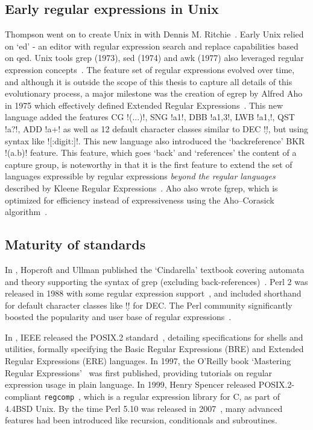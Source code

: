 \subsection{Early regular expressions in Unix}
Thompson went on to create Unix in \citeyear{Ritchie:1974:UTS:361011.361061} with Dennis M. Ritchie~.  Early Unix relied on `ed' - an editor with regular expression search and replace capabilities based on qed.  Unix tools grep (1973), sed (1974) and awk (1977) also leveraged regular expression concepts~.  The feature set of regular expressions evolved over time, and although it is outside the scope of this thesis to capture all details of this evolutionary process, a major milestone was the creation of egrep by Alfred Aho in 1975 which effectively defined Extended Regular Expressions~.  This new language added the features CG \bverb!(...)!, SNG \bverb!a{1}!, DBB \bverb!a{1,3}!, LWB \bverb!a{1,}!, QST \bverb!a?!, ADD \bverb!a+! as well as 12 default character classes similar to DEC \bverb!\d!, but using syntax like \bverb![:digit:]!. This new language also introduced the `backreference' BKR \bverb!(a.b)\1! feature.  This feature, which goes `back' and  `references' the content of a capture group, is noteworthy in that it is the first feature to extend the set of languages expressible by regular expressions \emph{beyond the regular languages} described by Kleene Regular Expressions~. Aho also wrote fgrep, which is optimized for efficiency instead of expressiveness using the Aho–Corasick algorithm~.

\subsection{Maturity of standards}
In \citeyear{HopcroftUllman1979}, Hopcroft and Ullman published the `Cindarella' textbook covering automata and theory supporting the syntax of grep (excluding back-references)~.  Perl 2 was released in 1988 with some regular expression support~, and included shorthand for default character classes like \bverb!\d! for DEC.  The Perl community significantly boosted the popularity and user base of regular expressions~.

In \citeyear{IEEE1994POSIX2}, IEEE released the POSIX.2 standard~, detailing specifications for shells and utilities, formally specifying the Basic Regular Expressions (BRE) and Extended Regular Expressions (ERE) languages.  In 1997, the O'Reilly book `Mastering Regular Expressions'~ was first published, providing tutorials on regular expression usage in plain language.  In 1999, Henry Spencer released POSIX.2-compliant {\tt regcomp}~, which is a regular expression library for C, as part of 4.4BSD Unix.  By the time Perl 5.10 was released in 2007~, many advanced features had been introduced like recursion, conditionals and subroutines.
